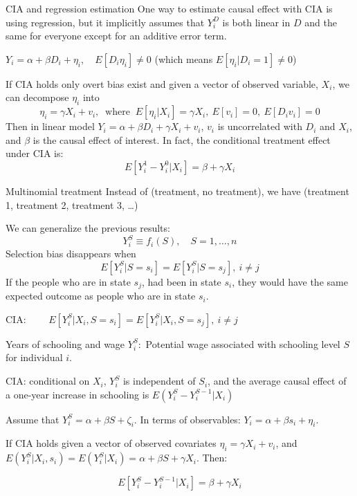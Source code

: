 \documentclass[handout]{beamer}
\begin{document}
\begin{frame}{CIA and regression estimation}
One way to estimate causal effect with CIA is using regression, but it implicitly assumes that $Y_i^D$ is both linear in $D$ and the same for everyone except for an additive error term.\medskip

$ Y_i= \alpha+\beta D_i+\eta_i, \quad E[D_i\eta_i]\neq0$ (which means $E[\eta_i|D_i=1]\neq0$)\medskip
\pause

If CIA holds only overt bias exist and given a vector of observed variable, $X_i$, we can decompose $\eta_i$ into \vspace{-5pt}
\[\eta_i=\gamma X_i+v_i, \ \text{ where  } \ E[\eta_i|X_i]=\gamma X_i,   \ E[v_i]=0, \ E[D_iv_i]=0 \]\pause
Then in linear model $ Y_i= \alpha+\beta D_i+\gamma X_i+v_i$, $v_i$ is uncorrelated with $D_i$ and $X_i$, and $\beta$ is the causal effect of interest. %
In fact, the conditional treatment effect under CIA is: 
\[ E[Y_i^1-Y_i^0|X_i]=\beta+\gamma X_i\]

\end{frame}


\begin{frame}{Multinomial treatment}
Instead of (treatment, no treatment), we have (treatment 1, treatment 2, treatment 3, \dots)\bigskip

We can generalize the previous results:
\[Y^S_{i}\equiv f_i(S) , \quad S=1,\dots,n \]
Selection bias disappears when \[E[Y^S_{i}|S=s_i]=E[Y^S_{i}|S=s_j], \ i\neq j \]
If the people who are in state $s_j$, had been in state $s_i$, they would have the same expected outcome as people who are in state $s_i$.\medskip

CIA: $\qquad E[Y^S_{i}|X_i,S=s_i]=E[Y^S_{i}|X_i,S=s_j], \ i\neq j$

\end{frame}

\begin{frame}{Years of schooling and wage}
$Y^S_i:$ Potential wage associated with schooling level $S$ for individual $i$.\bigskip

CIA: conditional on $X_i$, $Y^S_i$ is independent of $S_i$, and the average causal effect of a one-year increase in schooling is
$E(Y_i^S-Y_i^{S-1}|X_i)$\bigskip

Assume that $Y_i^S=\alpha+\beta S +\zeta_i$. 
In terms of observables: $Y_i=\alpha+\beta s_i+\eta_i$.\bigskip

If CIA holds given a vector of observed covariates $\eta_i=\gamma X_i+v_i$, and $E (Y_i^S|X_i, s_i) = E (Y_i^S|X_i)=\alpha+\beta S+\gamma X_i$. Then:\bigskip

\[E[Y_i^S-Y_i^{S-1}|X_i] = \beta + \gamma X_i\]

\end{frame}
\end{document}
